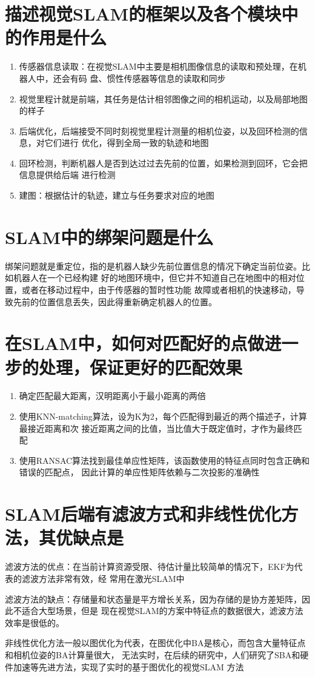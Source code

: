 \documentclass[10pt]{article}
\begin{document}
\section{描述视觉SLAM的框架以及各个模块中的作用是什么}
\begin{enumerate}
    \item 传感器信息读取：在视觉SLAM中主要是相机图像信息的读取和预处理，在机器人中，还会有码
    盘、惯性传感器等信息的读取和同步
    \item 视觉里程计就是前端，其任务是估计相邻图像之间的相机运动，以及局部地图的样子
    \item 后端优化，后端接受不同时刻视觉里程计测量的相机位姿，以及回环检测的信息，对它们进行
    优化，得到全局一致的轨迹和地图
    \item 回环检测，判断机器人是否到达过过去先前的位置，如果检测到回环，它会把信息提供给后端
    进行检测
    \item 建图：根据估计的轨迹，建立与任务要求对应的地图
\end{enumerate}
\section{SLAM中的绑架问题是什么}
绑架问题就是重定位，指的是机器人缺少先前位置信息的情况下确定当前位姿。比如机器人在一个已经构建
好的地图环境中，但它并不知道自己在地图中的相对位置，或者在移动过程中，由于传感器的暂时性功能
故障或者相机的快速移动，导致先前的位置信息丢失，因此得重新确定机器人的位置。
\section{在SLAM中，如何对匹配好的点做进一步的处理，保证更好的匹配效果}
\begin{enumerate}
    \item 确定匹配最大距离，汉明距离小于最小距离的两倍
    \item 使用KNN-matching算法，设为K为2，每个匹配得到最近的两个描述子，计算最接近距离和次
    接近距离之间的比值，当比值大于既定值时，才作为最终匹配
    \item 使用RANSAC算法找到最佳单应性矩阵，该函数使用的特征点同时包含正确和错误的匹配点，
    因此计算的单应性矩阵依赖与二次投影的准确性
\end{enumerate}
\section{SLAM后端有滤波方式和非线性优化方法，其优缺点是}
滤波方法的优点：在当前计算资源受限、待估计量比较简单的情况下，EKF为代表的滤波方法非常有效，经
常用在激光SLAM中

滤波方法的缺点：存储量和状态量是平方增长关系，因为存储的是协方差矩阵，因此不适合大型场景，但是
现在视觉SLAM的方案中特征点的数据很大，滤波方法效率是很低的。

非线性优化方法一般以图优化为代表，在图优化中BA是核心，而包含大量特征点和相机位姿的BA计算量很大，
无法实时，在后续的研究中，人们研究了SBA和硬件加速等先进方法，实现了实时的基于图优化的视觉SLAM
方法
\end{document}
